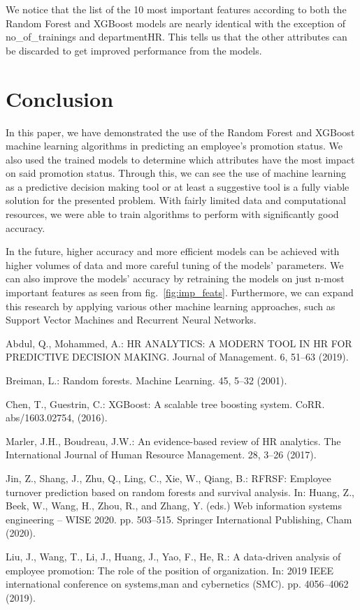 \documentclass[runningheads]{llncs}
\begin{document}
\newpage

We notice that the list of the 10 most important features according to
both the Random Forest and XGBoost models are nearly identical with the
exception of no\_of\_trainings and departmentHR. This tells us that the
other attributes can be discarded to get improved performance from the
models.

\hypertarget{conclusion}{%
\section{Conclusion}\label{conclusion}}

In this paper, we have demonstrated the use of the Random Forest and
XGBoost machine learning algorithms in predicting an employee's
promotion status. We also used the trained models to determine which
attributes have the most impact on said promotion status. Through this,
we can see the use of machine learning as a predictive decision making
tool or at least a suggestive tool is a fully viable solution for the
presented problem. With fairly limited data and computational resources,
we were able to train algorithms to perform with significantly good
accuracy.

In the future, higher accuracy and more efficient models can be achieved
with higher volumes of data and more careful tuning of the models'
parameters. We can also improve the models' accuracy by retraining the
models on just n-most important features as seen from
fig.~\ref{fig:imp_feats}. Furthermore, we can expand this research by
applying various other machine learning approaches, such as Support
Vector Machines and Recurrent Neural Networks.


\begin{thebibliography}{8}
%
{Abdul, Q., Mohammed, A.: HR ANALYTICS: A MODERN TOOL IN
HR FOR PREDICTIVE DECISION MAKING. Journal of Management. 6, 51--63
(2019).}

%
{Breiman, L.: Random forests. Machine Learning. 45, 5--32
(2001).}

%
{Chen, T., Guestrin, C.: XGBoost: {A} scalable tree
boosting system. CoRR. abs/1603.02754, (2016).}

%
{Marler, J.H., Boudreau, J.W.: An evidence-based review
of HR analytics. The International Journal of Human Resource Management.
28, 3--26 (2017).}

%
{Jin, Z., Shang, J., Zhu, Q., Ling, C., Xie, W., Qiang,
B.: RFRSF: Employee turnover prediction based on random forests and
survival analysis. In: Huang, Z., Beek, W., Wang, H., Zhou, R., and
Zhang, Y. (eds.) Web information systems engineering -- WISE 2020. pp.
503--515. Springer International Publishing, Cham (2020).}

%
{Liu, J., Wang, T., Li, J., Huang, J., Yao, F., He, R.: A
data-driven analysis of employee promotion: The role of the position of
organization. In: 2019 IEEE international conference on systems,man and
cybernetics (SMC). pp. 4056--4062 (2019).}

\end{thebibliography}
\end{document}
